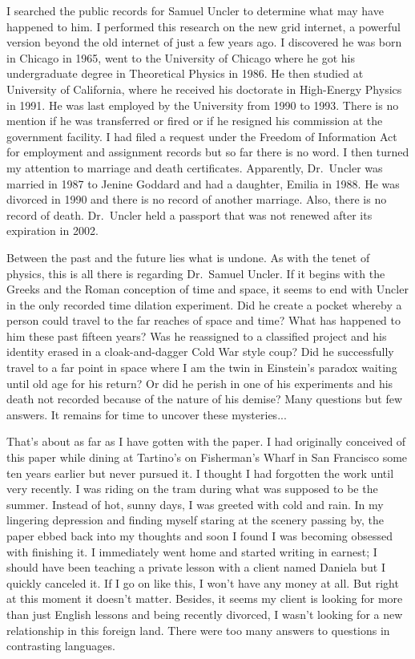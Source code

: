 I searched the public records for Samuel Uncler to determine what may
have happened to him. I performed this research on the new grid
internet, a powerful version beyond the old internet of just a few years
ago. I discovered he was born in Chicago in 1965, went to the University
of Chicago where he got his undergraduate degree in Theoretical Physics
in 1986. He then studied at University of California, where he received
his doctorate in High-Energy Physics in 1991. He was last employed by
the University from 1990 to 1993. There is no mention if he was
transferred or fired or if he resigned his commission at the government
facility. I had filed a request under the Freedom of Information Act for
employment and assignment records but so far there is no word. I then
turned my attention to marriage and death certificates. Apparently,
Dr.~Uncler was married in 1987 to Jenine Goddard and had a daughter,
Emilia in 1988. He was divorced in 1990 and there is no record of
another marriage. Also, there is no record of death. Dr.~Uncler held a
passport that was not renewed after its expiration in 2002.

Between the past and the future lies what is undone. As with the tenet
of physics, this is all there is regarding Dr.~Samuel Uncler. If it
begins with the Greeks and the Roman conception of time and space, it
seems to end with Uncler in the only recorded time dilation experiment.
Did he create a pocket whereby a person could travel to the far reaches
of space and time? What has happened to him these past fifteen years?
Was he reassigned to a classified project and his identity erased in a
cloak-and-dagger Cold War style coup? Did he successfully travel to a
far point in space where I am the twin in Einstein's paradox waiting
until old age for his return? Or did he perish in one of his experiments
and his death not recorded because of the nature of his demise? Many
questions but few answers. It remains for time to uncover these
mysteries...

That's about as far as I have gotten with the paper. I had originally
conceived of this paper while dining at Tartino's on Fisherman's Wharf
in San Francisco some ten years earlier but never pursued it. I thought
I had forgotten the work until very recently. I was riding on the tram
during what was supposed to be the summer. Instead of hot, sunny days, I
was greeted with cold and rain. In my lingering depression and finding
myself staring at the scenery passing by, the paper ebbed back into my
thoughts and soon I found I was becoming obsessed with finishing it. I
immediately went home and started writing in earnest; I should have been
teaching a private lesson with a client named Daniela but I quickly
canceled it. If I go on like this, I won't have any money at all. But
right at this moment it doesn't matter. Besides, it seems my client is
looking for more than just English lessons and being recently divorced,
I wasn't looking for a new relationship in this foreign land. There were
too many answers to questions in contrasting languages.

